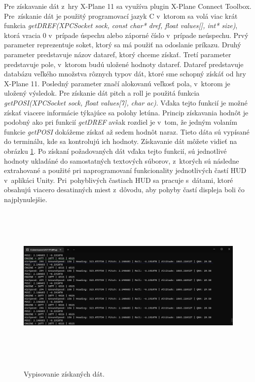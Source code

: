 Pre získavanie dát z~hry X-Plane 11 sa využíva plugin X-Plane Connect Toolbox. Pre~získanie dát je použitý programovací jazyk C v~ktorom sa volá viac krát funkcia \textit{getDREF(XPCSocket sock, const char* dref, float values[], int* size)}, ktorá vracia 0 v~prípade úspechu alebo záporné číslo v~prípade neúspechu. Prvý parameter reprezentuje soket, ktorý sa má použiť na odoslanie príkazu. Druhý parameter predstavuje názov dataref, ktorý chceme získať. Tretí parameter predstavuje pole, v~ktorom budú uložené hodnoty dataref. Dataref predstavuje databázu veľkého množstva rôznych typov dát, ktoré sme schopný získáť od hry X-Plane 11. Posledný parameter značí alokovanú veľkosť pola, v~ktorom je uložený výsledok. Pre získanie dát pitch a roll je použitá funkcia \textit{getPOSI(XPCSocket sock, float values[7], char ac)}. Vďaka tejto funkcií je možné získať viacere informácie týkajúce sa polohy letúna. Princip získavania hodnôt je podobný ako pri funkcií \textit{getDREF} avšak rozdiel je v~tom, že jedným volaním funkcie \textit{getPOSI} dokážeme získať až sedem hodnôt naraz. Tieto dáta sú vypísané do terminálu, kde sa kontrolujú ich hodnoty. Získavanie dát môžete vidieť na obrázku \ref{getData}. Po získaní požadovaných dát vďaka tejto funkcií, sú jednotlivé hodnoty ukladáné do samostatných textových súborov, z~ktorých sú následne extrahované a použité pri naprogramovaní funkcionality jednotlivých častí HUD v~aplikáci Unity. Pri~pohyblivých častiach HUD sa pracuje s~dátami, ktoré obsahujú viacero desatinných miest z~dôvodu, aby pohyby častí displeja boli čo najplynulejšie.
\begin{figure}[ht]
\centering
\includegraphics[width=15cm, height=8cm]{obrazky-figures/terminalData.png}
\caption{Vypisovanie získaných dát.}{\label{getData}}
\end{figure}


